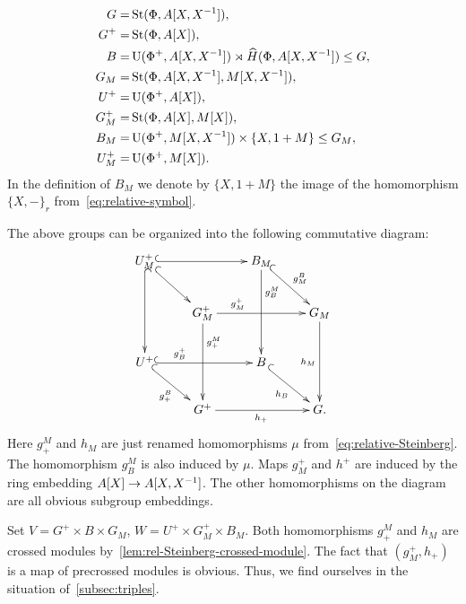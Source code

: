 {\allowdisplaybreaks\begin{align*}
    G     =& \operatorname{St}(\Phi, A[X, X^{-1}]),\\
    G^+   =& \operatorname{St}(\Phi, A[X]),\\
    B     =& \operatorname{U}(\Phi^+, A[X, X^{-1}]) \rtimes \widehat{H}(\Phi, A[X, X^{-1}]) \leq G,\\
    G_M   =& \operatorname{St}(\Phi, A[X, X^{-1}], M[X, X^{-1}]),\\
    U^+   =& \operatorname{U}(\Phi^+, A[X]),\\
    G^+_M =& \operatorname{St}(\Phi, A[X], M[X]),\\
    B_M   =& \operatorname{U}(\Phi^+, M[X, X^{-1}]) \times \{X, 1+M\} \leq G_M,\\
    U^+_M =& \operatorname{U}(\Phi^+, M[X]).
\end{align*}}
In the definition of $B_M$ we denote by $\{X, 1+M\}$ the image of the homomorphism $\{X, -\}_{r}$ from~\eqref{eq:relative-symbol}.

The above groups can be organized into the following commutative diagram:
\begin{equation} \label{eq:cube-Steinberg} \xymatrix{
    U^+_M \ar@{^{(}->}[rr] \ar@{^{(}->}[dd] \ar@{^{(}->}[rd] &                        & B_M \ar[dd]^(.3){g_B^M} \ar@{^{(}->}[rd]^{g^B_M} &           \\
    & G^+_M \ar[rr]^(.3){g^+_M} \ar^(.3){g^M_+}[dd] &                   & G_M \ar[dd]_{h_M} \\
    U^+ \ar@{^{(}->}[rr]^(.3){g_B^+} \ar@{^{(}->}[rd]_{g_+^B}          &                        & B \ar@{^{(}->}[rd]_{h_B}       &           \\
    & G^+ \ar[rr]_{h_+}              &                   & G.}\end{equation}
Here $g^M_+$ and $h_M$ are just renamed homomorphisms $\mu$ from~\eqref{eq:relative-Steinberg}.
The homomorphism $g^M_B$ is also induced by $\mu$.
Maps $g_M^+$ and $h^+$ are induced by the ring embedding $A[X] \to A[X, X^{-1}]$.
The other homomorphisms on the diagram are all obvious subgroup embeddings.

Set $V = G^+\times B \times G_M$, $W = U^+\times G^+_M \times B_M$.
Both homomorphisms $g_+^M$ and $h_M$ are crossed modules by~\cref{lem:rel-Steinberg-crossed-module}.
The fact that $(g^+_M, h_+)$ is a map of precrossed modules is obvious.
Thus, we find ourselves in the situation of~\cref{subsec:triples}.

